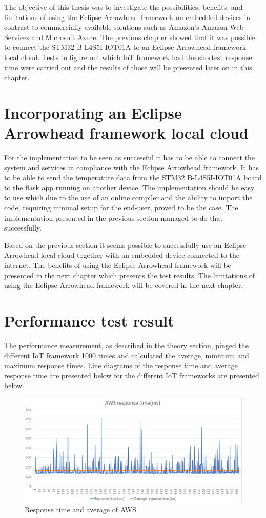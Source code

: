 The objective of this thesis was to investigate the possibilities, benefits, and limitations of using the Eclipse Arrowhead framework on embedded devices in contrast to commercially available solutions such
as Amazon's Amazon Web Services and Microsoft Azure. 
The previous chapter showed that it was possible to connect the STM32 B-L4S5I-IOT01A to an Eclipse Arrowhead framework local cloud.
Tests to figure out which IoT framework had the shortest response time were carried out and the results of those will be presented later on in this chapter.
\section{Incorporating an Eclipse Arrowhead framework local cloud}
For the implementation to be seen as successful it has to be able to connect the system and services in compliance with the Eclipse Arrowhead framework.
It has to be able to send the temperature data from the STM32 B-L4S5I-IOT01A board to the flask app running on another device.
The implementation should be easy to use which due to the use of an online compiler and the ability to import the code, requiring minimal setup for the end-user, proved to be the case.  
The implementation presented in the previous section managed to do that successfully.

Based on the previous section it seems possible to successfully use an Eclipse Arrowhead local cloud together with an embedded device connected to the internet. 
The benefits of using the Eclipse Arrowhead framework will be presented in the next chapter which presents the test results. 
The limitations of using the Eclipse Arrowhead framework will be covered in the next chapter.


\section{Performance test result}
The performance measurement, as described in the theory section, pinged the different IoT framework 1000 times and calculated the average, minimum and maximum response times. 
Line diagrams of the response time and average response time are presented below for the different IoT frameworks are presented below.
\begin{figure}[h!]
    \centering
    \includegraphics[width=\textwidth]{Pictures/AWS_response_time.png} 
    \caption{Response time and average of AWS}
    \label{AWS response time}
\end{figure}

